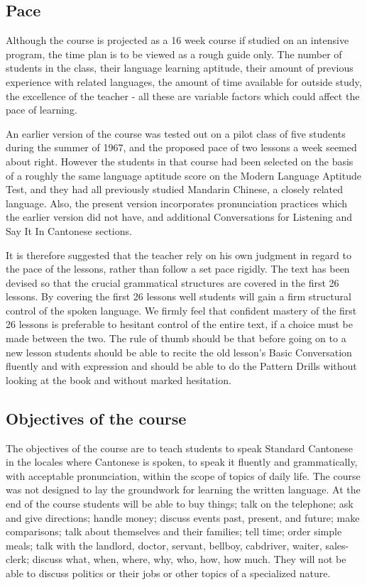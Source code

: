 
\subsection{Pace}

Although the course is projected as a 16 week course if studied on an intensive program, the time plan is to be viewed as a rough guide only. The number of students in the class, their language learning aptitude, their amount of previous experience with related languages, the amount of time available for outside study, the excellence of the teacher - all these are variable factors which could affect the pace of learning.

An earlier version of the course was tested out on a pilot class of five students during the summer of 1967, and the proposed pace of two lessons a week seemed about right. However the students in that course had been selected on the basis of a roughly the same language aptitude score on the Modern Language Aptitude Test, and they had all previously studied Mandarin Chinese, a closely related language. Also, the present version incorporates pronunciation practices which the earlier version did not have, and additional Conversations for Listening and Say It In Cantonese sections.

It is therefore suggested that the teacher rely on his own judgment in regard to the pace of the lessons, rather than follow a set pace rigidly. The text has been devised so that the crucial grammatical structures are covered in the first 26 lessons. By covering the first 26 lessons well students will gain a firm structural control of the spoken language. We firmly feel that confident mastery of the first 26 lessons is preferable to hesitant control of the entire text, if a choice must be made between the two. The rule of thumb should be that before going on to a new lesson students should be able to recite the old lesson's Basic Conversation fluently and with expression and should be able to do the Pattern Drills without looking at the book and without marked hesitation.


\subsection{Objectives of the course}

The objectives of the course are to teach students to speak Standard Cantonese in the locales where Cantonese is spoken, to speak it fluently and grammatically, with acceptable pronunciation, within the scope of topics of daily life. The course was not designed to lay the groundwork for learning the written language. At the end of the course students will be able to buy things; talk on the telephone; ask and give directions; handle money; discuss events past, present, and future; make comparisons; talk about themselves and their families; tell time; order simple meals; talk with the landlord, doctor, servant, bellboy, cabdriver, waiter, sales-clerk; discuss what, when, where, why, who, how, how much. They will not be able to discuss politics or their jobs or other topics of a specialized nature.


